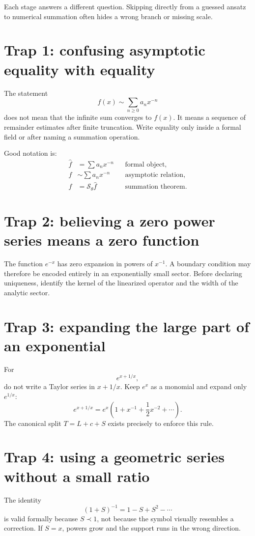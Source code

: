 \documentclass[11pt,openany]{book}
\theoremstyle{definition}
\theoremstyle{plain}
\theoremstyle{remark}
\newcommand{\asym}{\sim}
\newcommand{\precdom}{\prec}
\newcommand{\trans}[1]{\widehat{#1}}
\newcommand{\lateralsum}[1]{\mathcal{S}_{#1}}
\begin{document}
Each stage answers a different question. Skipping directly from a guessed ansatz to numerical summation often hides a wrong branch or missing scale.

\section{Trap 1: confusing asymptotic equality with equality}

The statement
\[
 f(x)\asym\sum_{n\ge0}a_nx^{-n}
\]
does not mean that the infinite sum converges to $f(x)$. It means a sequence of remainder estimates after finite truncation. Write equality only inside a formal field or after naming a summation operation.

Good notation is:
\begin{align*}
 \trans f&=\sum a_nx^{-n} &&\text{formal object},\\
 f&\asym\sum a_nx^{-n} &&\text{asymptotic relation},\\
 f&=\lateralsum{\theta}\trans f &&\text{summation theorem}.
\end{align*}

\section{Trap 2: believing a zero power series means a zero function}

The function $e^{-x}$ has zero expansion in powers of $x^{-1}$. A boundary condition may therefore be encoded entirely in an exponentially small sector. Before declaring uniqueness, identify the kernel of the linearized operator and the width of the analytic sector.

\section{Trap 3: expanding the large part of an exponential}

For
\[
 e^{x+1/x},
\]
do not write a Taylor series in $x+1/x$. Keep $e^x$ as a monomial and expand only $e^{1/x}$:
\[
 e^{x+1/x}=e^x\left(1+x^{-1}+\frac12x^{-2}+\cdots\right).
\]
The canonical split $T=L+c+S$ exists precisely to enforce this rule.

\section{Trap 4: using a geometric series without a small ratio}

The identity
\[
 (1+S)^{-1}=1-S+S^2-\cdots
\]
is valid formally because $S\precdom1$, not because the symbol visually resembles a correction. If $S=x$, powers grow and the support runs in the wrong direction.
\end{document}
